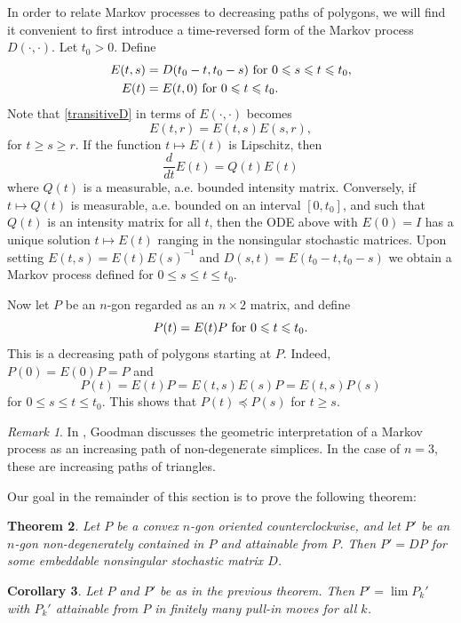 \documentclass[11pt]{amsart}
\newtheorem{theorem}{Theorem}[section]
\newtheorem{corollary}[theorem]{Corollary}
\theoremstyle{remark}
\newtheorem{remark}[theorem]{Remark}
\numberwithin{equation}{section}
\renewcommand{\precsim}{\preccurlyeq}
\renewcommand{\leq}{\leqslant}
\renewcommand{\geq}{\geqslant}
\renewcommand{\le}{\leqslant}
\renewcommand{\ge}{\geqslant}
\begin{document}
In order to relate  Markov processes to decreasing paths of polygons, we will find it convenient to first introduce a time-reversed form of the Markov process $D(\cdot,\cdot)$. Let $t_0>0$. Define 
\begin{align}\label{reversedMarkov}
E(t,s) &=D(t_0-t,t_0-s)\hbox{ for $0\le s\le t\le t_0$},\\
E(t) &=E(t,0)\hbox{ for $0\le t\leq t_0$}.
\end{align}
Note that \eqref{transitiveD} in terms of $E(\cdot, \cdot)$ becomes 
\[E(t,r)=E(t,s)E(s,r),\] for $t\geq s\geq r$.
If the function $t\mapsto E(t)$ is Lipschitz, then 
\[
\frac{d}{dt} E(t)=Q(t) E(t)
\]
where $Q(t)$ is a measurable, a.e. bounded intensity matrix.  Conversely, if $t\mapsto Q(t)$ is measurable, a.e. bounded on an interval $[0,t_0]$, and  such that $Q(t)$ is an intensity matrix for all  $t$, then the ODE above with $E(0)=I$ has a unique solution $t\mapsto E(t)$ ranging in the nonsingular stochastic matrices. Upon setting  $E(t,s)=E(t)E(s)^{-1}$ and $D(s,t)=E(t_0-t,t_0-s)$ we obtain a Markov process defined for $0\leq s\leq t\leq t_0$.



Now let $P$ be an $n$-gon regarded as an $n\times 2$ matrix, and define
\[
P(t)=E(t)P\hbox{ for $0\leq t\leq t_0$}.
\]
This is a decreasing path of polygons starting at $P$. Indeed,   $P(0)=E(0)P=P$ and 
\[
P(t)=E(t)P=E(t,s)E(s)P=E(t,s)P(s)
\] 
for $0\le s\le t\le t_0$. This shows that $P(t)\precsim P(s)$ for $t\ge s$. %




\begin{remark}
In \cite{goodmanCIME}, Goodman discusses the geometric interpretation of a Markov process as an increasing path of non-degenerate simplices. In the case of $n=3$, these are increasing paths of triangles.
\end{remark}



Our goal in the remainder of this section is to prove the following theorem:
\begin{theorem}\label{Plift}
Let $P$ be a convex $n$-gon oriented counterclockwise, and let $P'$ be an $n$-gon non-degenerately contained in $P$ and attainable from $P$. Then
$P'=DP$ for some  embeddable nonsingular stochastic matrix $D$.
\end{theorem}

\begin{corollary}\label{Pchattering}
Let $P$ and $P'$ be as in the previous theorem. Then $P'=\lim P_k'$ with $P_k'$  attainable from $P$ in finitely many pull-in moves for all $k$.
\end{corollary}
\end{document}
